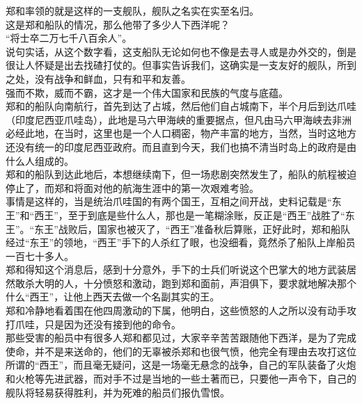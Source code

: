 \begin{multicols}{\theparacolNo}
郑和率领的就是这样的一支舰队，舰队之名实在实至名归。\\

这是郑和船队的情况，那么他带了多少人下西洋呢？\\

“将士卒二万七千八百余人”。\\

说句实话，从这个数字看，这支船队无论如何也不像是去寻人或是办外交的，倒是很让人怀疑是出去找碴打仗的。但事实告诉我们，这确实是一支友好的舰队，所到之处，没有战争和鲜血，只有和平和友善。\\

强而不欺，威而不霸，这才是一个伟大国家和民族的气度与底蕴。\\

郑和的船队向南航行，首先到达了占城，然后他们自占城南下，半个月后到达爪哇（印度尼西亚爪哇岛），此地是马六甲海峡的重要据点，但凡由马六甲海峡去非洲必经此地，在当时，这里也是一个人口稠密，物产丰富的地方，当然，当时这地方还没有统一的印度尼西亚政府。而且直到今天，我们也搞不清当时岛上的政府是由什么人组成的。\\

郑和的船队到达此地后，本想继续南下，但一场悲剧突然发生了，船队的航程被迫停止了，而郑和将面对他的航海生涯中的第一次艰难考验。\\

事情是这样的，当是统治爪哇国的有两个国王，互相之间开战，史料记载是“东王”和“西王”，至于到底是些什么人，那也是一笔糊涂账，反正是“西王”战胜了“东王”。“东王”战败后，国家也被灭了，“西王”准备秋后算账，正好此时，郑和船队经过“东王”的领地，“西王”手下的人杀红了眼，也没细看，竟然杀了船队上岸船员一百七十多人。\\

郑和得知这个消息后，感到十分意外，手下的士兵们听说这个巴掌大的地方武装居然敢杀大明的人，十分愤怒和激动，跑到郑和面前，声泪俱下，要求就地解决那个什么“西王”，让他上西天去做一个名副其实的王。\\

郑和冷静地看着围在他四周激动的下属，他明白，这些愤怒的人之所以没有动手攻打爪哇，只是因为还没有接到他的命令。\\

那些受害的船员中有很多人郑和都见过，大家辛辛苦苦跟随他下西洋，是为了完成使命，并不是来送命的，他们的无辜被杀郑和也很气愤，他完全有理由去攻打这位所谓的“西王”，而且毫无疑问，这是一场毫无悬念的战争，自己的军队装备了火炮和火枪等先进武器，而对手不过是当地的一些土著而已，只要他一声令下，自己的舰队将轻易获得胜利，并为死难的船员们报仇雪恨。\\


\end{multicols}

